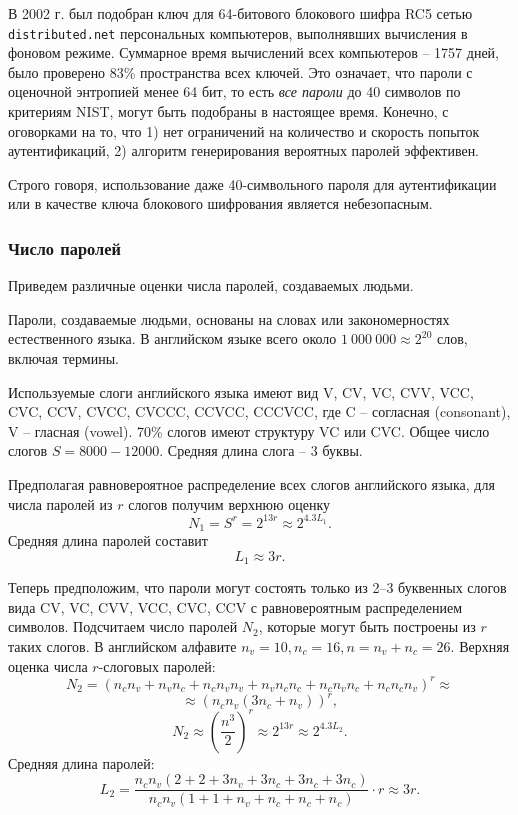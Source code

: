 \documentclass[10pt,a4paper]{book}
\begin{document}
В 2002 г. был подобран ключ для 64-битового блокового шифра RC5 сетью \texttt{distributed.net} персональных компьютеров, выполнявших вычисления в фоновом режиме. Суммарное время вычислений всех компьютеров -- 1757 дней, было проверено 83\% пространства всех ключей. Это означает, что пароли с оценочной энтропией менее 64 бит, то есть \emph{все пароли} до 40 символов по критериям NIST, могут быть подобраны в настоящее время. Конечно, с оговорками на то, что 1) нет ограничений на количество и скорость попыток аутентификаций, 2) алгоритм генерирования вероятных паролей эффективен.

Строго говоря, использование даже 40-символьного пароля для аутентификации или в качестве ключа блокового шифрования является небезопасным.


\subsubsection{Число паролей}

Приведем различные оценки числа паролей, создаваемых людьми.

Пароли, создаваемые людьми, основаны на словах или закономерностях естественного языка. В английском языке всего около $1\ 000\ 000 \approx 2^{20}$ слов, включая термины.


Используемые слоги английского языка имеют вид V, CV, VC, CVV, VCC, CVC, CCV, CVCC, CVCCC, CCVCC, CCCVCC, где C -- согласная (consonant), V -- гласная (vowel). 70\% слогов имеют структуру VC или CVC. Общее число слогов $S = 8000 - 12000$. Средняя длина слога -- 3 буквы.

Предполагая равновероятное распределение всех слогов английского языка, для числа паролей из $r$ слогов получим верхнюю оценку
    \[ N_1 = S^r = 2^{13 r} \approx 2^{4.3 L_1}. \]
Средняя длина паролей составит
    \[ L_1 \approx 3 r. \]

Теперь предположим, что пароли могут состоять только из 2--3 буквенных слогов вида CV, VC, CVV, VCC, CVC, CCV с равновероятным распределением символов. Подсчитаем число паролей $N_2$, которые могут быть построены из $r$ таких слогов. В английском алфавите $n_v = 10, n_c = 16, n = n_v + n_c = 26$. Верхняя оценка числа $r$-слоговых паролей:
    \[ N_2 = (n_c n_v + n_v n_c + n_c n_v n_v + n_v n_c n_c + n_c n_v n_c + n_c n_c n_v)^r \approx \]
        \[ \approx \left( n_c n_v(3 n_c + n_v) \right)^r, \]
    \[ N_2 \approx \left( \frac{n^3}{2} \right)^r \approx 2^{13 r} \approx 2^{4.3 L_2}. \]
Средняя длина паролей:
    \[ L_2 = \frac{n_c n_v(2 + 2 + 3 n_v + 3 n_c + 3 n_c + 3 n_c)}{n_c n_v (1 + 1 + n_v + n_c + n_c + n_c)} \cdot r \approx 3 r. \]
\end{document}
